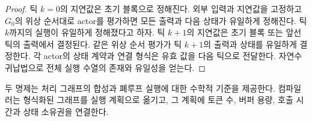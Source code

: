 \begin{proof}
틱 $k=0$의 지연값은 초기 블록으로 정해진다.
외부 입력과 지연값을 고정하고 $G_0$의 위상 순서대로 actor를 평가하면
모든 출력과 다음 상태가 유일하게 정해진다.
틱 $k$까지의 실행이 유일하게 정해졌다고 하자.
틱 $k+1$의 지연값은 초기 블록 또는 앞선 틱의 출력에서 결정된다.
같은 위상 순서 평가가 틱 $k+1$의 출력과 상태를 유일하게 결정한다.
각 actor의 상태 계약과 연결 형식은 유효 값을 다음 틱으로 전달한다.
자연수 귀납법으로 전체 실행 수열의 존재와 유일성을 얻는다.
\end{proof}

두 명제는 처리 그래프의 합성과 폐루프 실행에 대한 수학적 기준을 제공한다.
컴파일러는 형식화된 그래프를 실행 계획으로 옮기고,
그 계획에 토큰 수, 버퍼 용량, 호출 시간과 상태 소유권을 연결한다.
